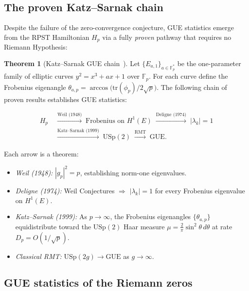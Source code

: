 \documentclass[12pt,oneside]{book}
\theoremstyle{definition}
\newtheorem{theorem}{Theorem}[chapter]
\begin{document}
\subsection{The proven Katz--Sarnak chain}

Despite the failure of the zero-convergence conjecture, GUE statistics
emerge from the RPST Hamiltonian $H_p$ via a fully \emph{proven} pathway
that requires no Riemann Hypothesis:

\begin{theorem}[Katz--Sarnak GUE chain~\cite{KatzSarnak1999,Deligne1974}]
\label{thm:katz-sarnak-chain}
Let $\{E_{a,1}\}_{a \in \mathbb{F}_p^*}$ be the one-parameter family of
elliptic curves $y^2 = x^3 + ax + 1$ over $\mathbb{F}_p$.  For each curve
define the Frobenius eigenangle $\theta_{a,p} = \arccos\!\bigl(\mathrm{tr}(\phi_p)/2\sqrt{p}\bigr)$.
The following chain of proven results establishes GUE statistics:

\begin{align}
  H_p
  &\;\xrightarrow{\text{Weil (1948)}}\;
  \text{Frobenius on } H^1(E)
  \;\xrightarrow{\text{Deligne (1974)}}\;
  |\lambda_k|=1\nonumber\\
  &\;\xrightarrow{\text{Katz--Sarnak (1999)}}\;
  \mathrm{USp}(2)
  \;\xrightarrow{\text{RMT}}\;
  \mathrm{GUE}.
\end{align}

Each arrow is a theorem:
\begin{itemize}
  \item \emph{Weil (1948):} $|g_p|^2 = p$, establishing norm-one eigenvalues.
  \item \emph{Deligne (1974):} Weil Conjectures $\Rightarrow$ $|\lambda_k| = 1$
        for every Frobenius eigenvalue on $H^1(E)$.
  \item \emph{Katz--Sarnak (1999):} As $p \to \infty$, the Frobenius eigenangles
        $\{\theta_{a,p}\}$ equidistribute toward the $\mathrm{USp}(2)$ Haar
        measure $\mu = \tfrac{2}{\pi}\sin^2\!\theta\,d\theta$ at rate
        $D_p = O(1/\sqrt{p})$.
  \item \emph{Classical RMT:} $\mathrm{USp}(2g) \to \mathrm{GUE}$ as $g \to \infty$.
\end{itemize}
\end{theorem}

\subsection{GUE statistics of the Riemann zeros}
\end{document}
